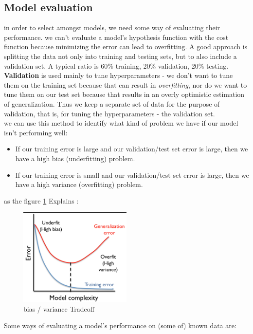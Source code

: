 \subsection{Model evaluation} 
in order to select amongst models, we need some way of evaluating their performance.
we can't evaluate a model's hypothesis function with the cost function because minimizing the error can lead to overfitting.
A good approach is splitting the data  not  only into training and testing sets, but to also include a validation set. A typical ratio is 60\% training, 20\% validation, 20\% testing.
\textbf{Validation} is used mainly to tune hyperparameters - we don't want to tune them on the training set because that can result in \textit{overfitting}, nor do we want to tune them on our test set because that results in an overly optimistic estimation of generalization. Thus we keep a separate set of data for the purpose of validation, that is, for tuning the hyperparameters - the validation set.\\
we can use this method  to identify what kind of problem we have if our model isn't performing well:

\begin{itemize}
\item If our training error is large and our validation/test set error is large, then we have a high bias (underfitting) problem.
\item If our training error is small and our validation/test set error is large, then we have a high variance (overfitting) problem.
\end{itemize}

as the figure \ref{fig:bias} Explains : 

\begin{figure}[H]
\centering
\includegraphics[width=0.5\textwidth]{img/model.png}
\caption{ bias / variance Tradeoff}
\label{fig:bias}
\end{figure}

Some ways of evaluating a model's performance on (some of)  known data are:

